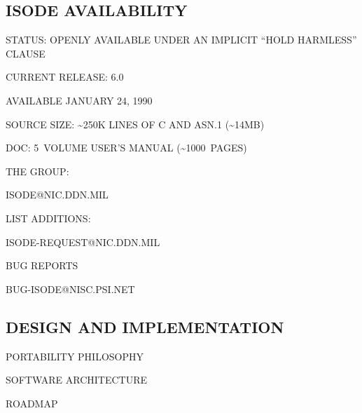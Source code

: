 \begin{bwslide}
\part*	{ISODE AVAILABILITY}\bf

\begin{nrtc}
\item	STATUS: OPENLY AVAILABLE UNDER AN IMPLICIT ``HOLD HARMLESS'' CLAUSE

\item	CURRENT RELEASE: 6.0
    \begin{nrtc}
    \item	AVAILABLE JANUARY 24, 1990
    \end{nrtc}

\item	SOURCE SIZE: \~{}250K LINES OF C AND ASN.1 (\~{}14MB)

\item	DOC: 5~VOLUME USER'S MANUAL (\~{}1000~PAGES)
\end{nrtc}
\end{bwslide}


\begin{bwslide}

\begin{nrtc}
\item	THE GROUP:
    \begin{nrtc}
    \item	ISODE@NIC.DDN.MIL
    \end{nrtc}

\item	LIST ADDITIONS:
    \begin{nrtc}
    \item	ISODE-REQUEST@NIC.DDN.MIL
    \end{nrtc}

\item	BUG REPORTS
    \begin{nrtc}
    \item	BUG-ISODE@NISC.PSI.NET
    \end{nrtc}
\end{nrtc}
\end{bwslide}


\begin{bwslide}
\part	{DESIGN AND IMPLEMENTATION}\bf

\begin{nrtc}
\item	PORTABILITY PHILOSOPHY

\item	SOFTWARE ARCHITECTURE

\item	ROADMAP
\end{nrtc}
\end{bwslide}


